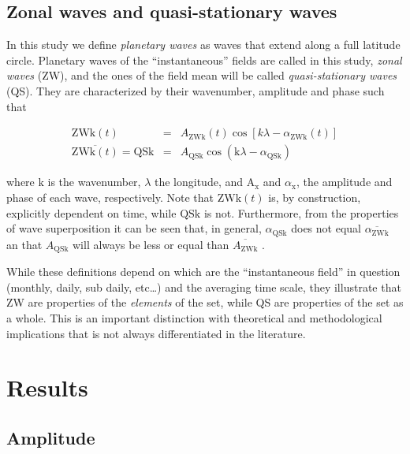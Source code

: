 \documentclass[draft,linenumbers]{agujournal2018}
\begin{document}
\subsection{Zonal waves and quasi-stationary waves}

In this study we define \emph{planetary waves} as waves that extend
along a full latitude circle. Planetary waves of the ``instantaneous''
fields are called in this study, \emph{zonal waves} (ZW), and the ones
of the field mean will be called \emph{quasi-stationary waves} (QS).
They are characterized by their wavenumber, amplitude and phase such
that

\begin{linenomath*}
\begin{eqnarray}\label{eq:ZW}
\mathrm{ZWk}(t) & = & A_\mathrm{ZWk}(t)\cos \left [ k\lambda - \alpha_\mathrm{ZWk}(t) \right ] \\ 
\overline{\mathrm{ZWk}(t)} = \mathrm{QSk} & = & A_\mathrm{QSk}\cos \left (  \mathrm{k}\lambda - \alpha_\mathrm{QSk} \right ) \label{eq:QS}
\end{eqnarray}
\end{linenomath*}

where \(\mathrm{k}\) is the wavenumber, \(\lambda\) the longitude, and
\(\mathrm{A_{x}}\) and \(\alpha_\mathrm{x}\), the amplitude and phase of
each wave, respectively. Note that \(\mathrm{ZWk}(t)\) is, by
construction, explicitly dependent on time, while \(\mathrm{QSk}\) is
not. Furthermore, from the properties of wave superposition it can be
seen that, in general, \(\alpha_\mathrm{QSk}\) does not equal
\(\overline{\alpha_\mathrm{ZWk}}\) an that \(A_\mathrm{QSk}\) will
always be less or equal than \(\overline{A_\mathrm{ZWk}}\)
\citep{Pain2005}.

While these definitions depend on which are the ``instantaneous field''
in question (monthly, daily, sub daily, etc\ldots{}) and the averaging
time scale, they illustrate that ZW are properties of the
\emph{elements} of the set, while QS are properties of the set as a
whole. This is an important distinction with theoretical and
methodological implications that is not always differentiated in the
literature.

\section{Results}

\subsection{Amplitude}
\end{document}
